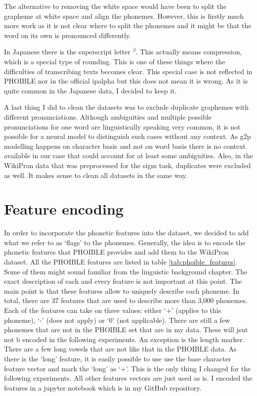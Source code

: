 The alternative to removing the white space would have been to split the grapheme at white space and align the phonemes. However, this is firstly much more work as it is not clear where to split the phonemes and it might be that the word on its own is pronounced differently. 

In Japanese there is the superscript letter $^\beta$. This actually means compression, which is a special type of rounding. This is one of these things where the difficulties of transcribing texts becomes clear. This special case is not reflected in PHOIBLE nor in the official \ac{ipalpha} but this does not mean it is wrong. As it is quite common in the Japanese data, I decided to keep it.

A last thing I did to clean the datasets was to exclude duplicate graphemes with different pronunciations. Although ambiguities and multiple possible pronunciations for one word are linguistically speaking very common, it is not possible for a neural model to distinguish such cases without any context. As \ac{g2p} modelling happens on character basis and not on word basis there is no context available in our case that could account for at least some ambiguities. Also, in the WikiPron data that was preprocessed for the \ac{sigm} task, duplicates were excluded as well. It makes sense to clean all datasets in the same way.


\section{Feature encoding}
\label{sec:feature_enc}
In order to incorporate the phonetic features into the dataset, we decided to add what we refer to as `flags' to the phonemes. Generally, the idea is to encode the phonetic features that PHOIBLE provides and add them to the WikiPron dataset. All the PHOIBLE features are listed in table \ref{tab:phoible_features}. Some of them might sound familiar from the linguistic background chapter. The exact description of each and every feature is not important at this point. The main point is that these features allow to uniquely describe each phoneme. In total, there are 37 features that are used to describe more than 3,000 phonemes. Each of the features can take on three values: either `+' (applies to this phoneme), `-' (does not apply) or `0' (not applicable). There are still a few phonemes that are not in the PHOIBLE set that are in my data. These will jsut not b encoded in the following experiments. An exception is the length marker. There are a few long vowels that are not like that in the PHOIBLE data. As there is the `long' feature, it is easily possible to use use the base character feature vector and mark the `long' as `+'. This is the only thing I changed for the following experiments. All other features vectors are just used as is. I encoded the features in a jupyter notebook which is in my GitHub repository.

